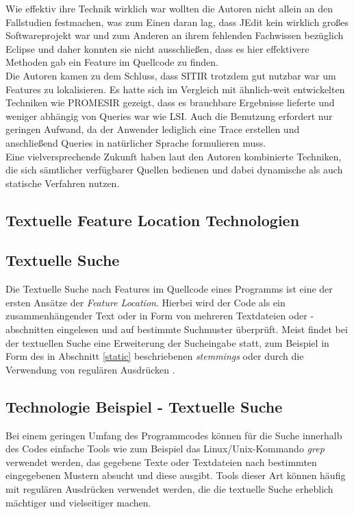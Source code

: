 \documentclass[runningheads,a4paper]{llncs}
\begin{document}
Wie effektiv ihre Technik wirklich war wollten die Autoren nicht allein an den Fallstudien festmachen, was zum Einen daran lag, dass JEdit kein wirklich großes Softwareprojekt war und zum Anderen an ihrem fehlenden Fachwissen bezüglich Eclipse und daher konnten sie nicht ausschließen, dass es hier effektivere Methoden gab ein Feature im Quellcode zu finden.\\
Die Autoren kamen zu dem Schluss, dass SITIR trotzdem gut nutzbar war um Features zu lokalisieren. Es hatte sich im Vergleich mit ähnlich-weit entwickelten Techniken wie PROMESIR gezeigt, dass es brauchbare Ergebnisse lieferte und weniger abhängig von Queries war wie LSI. Auch die Benutzung erfordert nur geringen Aufwand, da der Anwender lediglich eine Trace erstellen und anschließend Queries in natürlicher Sprache formulieren muss.\\
Eine vielversprechende Zukunft haben laut den Autoren kombinierte Techniken, die sich sämtlicher verfügbarer Quellen bedienen und dabei dynamische als auch statische Verfahren nutzen. 
\subsection{Textuelle Feature Location Technologien}

\subsection*{Textuelle Suche}

Die Textuelle Suche nach Features im Quellcode eines Programms ist eine der ersten Ansätze der \textit{Feature Location}. Hierbei wird der Code als ein zusammenhängender Text oder in Form von mehreren Textdateien oder -abschnitten eingelesen und auf bestimmte Suchmuster überprüft. Meist findet bei der textuellen Suche eine Erweiterung der Sucheingabe statt, zum Beispiel in Form des in Abschnitt \ref{static} beschriebenen \textit{stemmings} oder durch die Verwendung von regulären Ausdrücken \cite{grep}.

\subsection*{Technologie Beispiel - Textuelle Suche}

Bei einem geringen Umfang des Programmcodes können für die Suche innerhalb des Codes einfache Tools wie zum Beispiel das Linux/Unix-Kommando \textit{grep} verwendet werden, das gegebene Texte oder Textdateien nach bestimmten eingegebenen Mustern absucht und diese ausgibt. Tools dieser Art können häufig mit regulären Ausdrücken verwendet werden, die die textuelle Suche erheblich mächtiger und vielseitiger machen.
\end{document}
